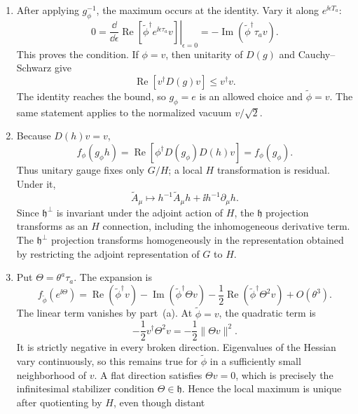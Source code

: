 \begin{enumerate}
  \begin{enumerate}
    \item[(a)]
    After applying \(g_\phi^{-1}\), the maximum occurs at the identity.
    Vary it along \(e^{\ii\epsilon T_a}\):
    \[
      0=\left.\frac \dd{\dd\epsilon}
      \operatorname{Re}\!\left[
        \widetilde\phi^\dagger e^{\ii\epsilon\tau_a}v\right]
      \right|_{\epsilon=0}
      =-\operatorname{Im}
        (\widetilde\phi^\dagger\tau_av).
    \]
    This proves the condition.  If \(\phi=v\), then unitarity of \(D(g)\)
    and Cauchy--Schwarz give
    \[
      \operatorname{Re}[v^\dagger D(g)v]\le v^\dagger v.
    \]
    The identity reaches the bound, so \(g_\phi=e\) is an allowed choice
    and \(\widetilde\phi=v\).  The same statement applies to the normalized
    vacuum \(v/\sqrt2\).
    \item[(b)]
    Because \(D(h)v=v\),
    \[
      f_\phi(g_\phi h)
        =\operatorname{Re}[\phi^\dagger D(g_\phi)D(h)v]
        =f_\phi(g_\phi).
    \]
    Thus unitary gauge fixes only \(G/H\); a local \(H\) transformation is
    residual.  Under it,
    \[
      \widetilde A_\mu\mapsto
        h^{-1}\widetilde A_\mu h+\ii h^{-1}\partial_\mu h .
    \]
    Since \(\mathfrak h^\perp\) is invariant under the adjoint action of
    \(H\), the \(\mathfrak h\) projection transforms as an \(H\) connection,
    including the inhomogeneous derivative term.  The
    \(\mathfrak h^\perp\) projection transforms homogeneously in the
    representation obtained by restricting the adjoint representation of
    \(G\) to \(H\).
    \item[(c)]
    Put \(\Theta=\theta^a\tau_a\).  The expansion is
    \[
      f_{\widetilde\phi}(e^{\ii\Theta})
      =\operatorname{Re}(\widetilde\phi^\dagger v)
       -\operatorname{Im}(\widetilde\phi^\dagger\Theta v)
       -\frac12\operatorname{Re}
          (\widetilde\phi^\dagger\Theta^2v)+O(\theta^3).
    \]
    The linear term vanishes by part~(a).  At
    \(\widetilde\phi=v\), the quadratic term is
    \[
      -\frac12v^\dagger\Theta^2v
        =-\frac12\|\Theta v\|^2.
    \]
    It is strictly negative in every broken direction.  Eigenvalues of the
    Hessian vary continuously, so this remains true for
    \(\widetilde\phi\) in a sufficiently small neighborhood of \(v\).
    A flat direction satisfies \(\Theta v=0\), which is precisely the
    infinitesimal stabilizer condition \(\Theta\in\mathfrak h\).  Hence the
    local maximum is unique after quotienting by \(H\), even though distant

\end{enumerate}
\end{enumerate}
